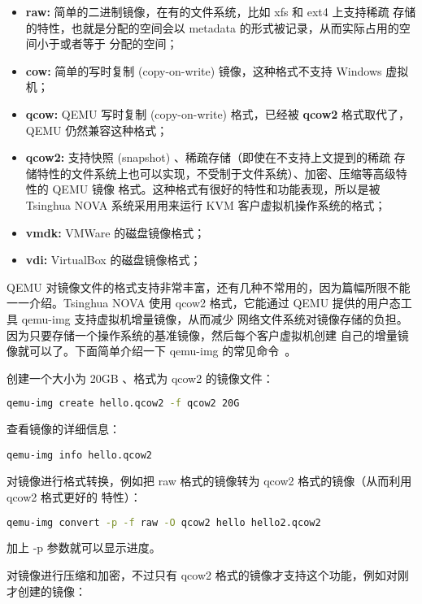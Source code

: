 \begin{itemize}
    \item \textbf{raw:} 简单的二进制镜像，在有的文件系统，比如 xfs 和 ext4 上支持稀疏
    存储的特性，也就是分配的空间会以 metadata 的形式被记录，从而实际占用的空间小于或者等于
    分配的空间；
    \item \textbf{cow:} 简单的写时复制 (copy-on-write) 镜像，这种格式不支持 Windows
    虚拟机；
    \item \textbf{qcow:} QEMU 写时复制 (copy-on-write) 格式，已经被 \textbf{qcow2}
    格式取代了，QEMU 仍然兼容这种格式；
    \item \textbf{qcow2:} 支持快照 (snapshot) 、稀疏存储（即使在不支持上文提到的稀疏
    存储特性的文件系统上也可以实现，不受制于文件系统）、加密、压缩等高级特性的 QEMU 镜像
    格式。这种格式有很好的特性和功能表现，所以是被 Tsinghua NOVA 系统采用用来运行 KVM
    客户虚拟机操作系统的格式；
    \item \textbf{vmdk:} VMWare 的磁盘镜像格式；
    \item \textbf{vdi:} VirtualBox 的磁盘镜像格式；
\end{itemize}

QEMU 对镜像文件的格式支持非常丰富，还有几种不常用的，因为篇幅所限不能一一介绍。Tsinghua NOVA
使用 qcow2 格式，它能通过 QEMU 提供的用户态工具 qemu-img 支持虚拟机增量镜像，从而减少
网络文件系统对镜像存储的负担。因为只要存储一个操作系统的基准镜像，然后每个客户虚拟机创建
自己的增量镜像就可以了。下面简单介绍一下 qemu-img 的常见命令~\cite{docker-in-practice}。

创建一个大小为 20GB 、格式为 qcow2 的镜像文件：

\begin{lstlisting}[language=bash]
qemu-img create hello.qcow2 -f qcow2 20G
\end{lstlisting}

查看镜像的详细信息：

\begin{lstlisting}
qemu-img info hello.qcow2
\end{lstlisting}

对镜像进行格式转换，例如把 raw 格式的镜像转为 qcow2 格式的镜像（从而利用 qcow2 格式更好的
特性）：

\begin{lstlisting}[language=bash]
qemu-img convert -p -f raw -O qcow2 hello hello2.qcow2
\end{lstlisting}

加上 -p 参数就可以显示进度。

对镜像进行压缩和加密，不过只有 qcow2 格式的镜像才支持这个功能，例如对刚才创建的镜像：

